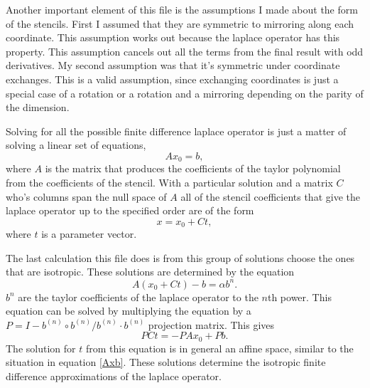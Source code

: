 \documentclass[pdftex,12pt,a4paper]{article}
\begin{document}
		Another important element of this file is the assumptions I made about the form of the stencils. First I assumed that they are symmetric to mirroring along each coordinate. This assumption works out because the laplace operator has this property. This assumption cancels out all the terms from the final result with odd derivatives. My second assumption was that it's symmetric under coordinate exchanges. This is a valid assumption, since exchanging coordinates is just a special case of a rotation or a rotation and a mirroring depending on the parity of the dimension.
		
		Solving for all the possible finite difference laplace operator is just a matter of solving a linear set of equations, 
		\begin{equation}
			Ax_0=b,
			\label{Axb}
		\end{equation}
		where $A$ is the matrix that produces the coefficients of the taylor polynomial from the coefficients of the stencil. With a particular solution and a matrix $C$ who's columns span the null space of $A$ all of the stencil coefficients that give the laplace operator up to the specified order are of the form
		\begin{equation}
			x = x_0 + Ct,
			\label{laplaceCoeffs}
		\end{equation}
		where $t$ is a parameter vector.
		
		The last calculation this file does is from this group of solutions choose the ones that are isotropic. These solutions are determined by the equation
		\begin{equation}
			A(x_0 + Ct) - b = \alpha b^{n}.
		\end{equation}
		$b^{n}$ are the taylor coefficients of the laplace operator to the $n$th power. This equation can be solved by multiplying the equation by a $P = I - b^{(n)} \circ b^{(n)} / b^{(n)} \cdot b^{(n)}$ projection matrix. This gives
		\begin{equation}
			PCt = - PAx_0 + Pb.
		\end{equation}
		The solution for $t$ from this equation is in general an affine space, similar to the situation in equation \ref{Axb}. These solutions determine the isotropic finite difference approximations of the laplace operator.
\end{document}
